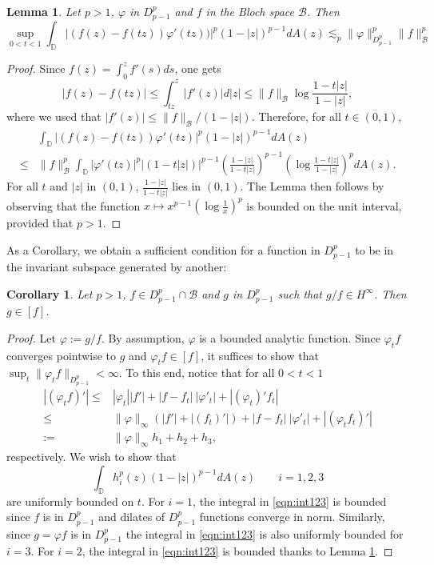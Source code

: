 \documentclass{birkjour}
\numberwithin{equation}{section}
\theoremstyle{plain}
\newtheorem{lemma}[theo]{Lemma}
\newtheorem{coro}[theo]{Corollary}
\theoremstyle{definition}
\newcommand{\D}{\mathbb{D}}
\newcommand{\1}{\mathds{1}}
\begin{document}
\begin{lemma}
    \label{lemma:int}
Let $p>1$, $\varphi$ in $D^p_{p-1}$ and $f$ in the Bloch space $\mathcal{B}$. Then 
\[
\sup_{0<t<1}\int_\D|(f(z)-f(tz))\varphi'(tz))|^p(1-|z|)^{p-1}dA(z)\lesssim_p\|\varphi\|_{D^p_{p-1}}^p\|f\|_{\mathcal{B}}^p
\]
\end{lemma}
\begin{proof}
Since $f(z)=\int_0^zf'(s)ds$, one gets
\[
|f(z)-f(tz)|\le\int_{tz}^z|f'(z)|d|z|\le\|f\|_\mathcal{B}\log\frac{1-t|z|}{1-|z|},
\]
where we used that $|f'(z)|\le\|f\|_\mathcal{B}/(1-|z|)$. Therefore, for all $t\in(0, 1)$,
\[
\begin{split}
&\int_\D|(f(z)-f(tz))\varphi'(tz)|^p(1-|z|)^{p-1}dA(z)\\
\le&\|f\|^p_\mathcal{B}\int_\D|\varphi'(tz)|^p|(1-t|z|)|^{p-1}\left(\frac{1-|z|}{1-t|z|}\right)^{p-1}\left(\log\frac{1-t|z|}{1-|z|}\right)^pdA(z).
\end{split}
\]
For all $t$ and $|z|$ in $(0, 1)$, $\frac{1-|z|}{1-t|z|}$ lies in $(0, 1)$. The Lemma then follows by observing that the function $x\mapsto x^{p-1}\left(\log\frac{1}{x}\right)^p$ is bounded on the unit interval, provided that $p>1$.
\end{proof}
As a Corollary, we obtain a sufficient condition for a function  in $D^p_{p-1}$ to be in the invariant subspace generated by another:
\begin{coro}
\label{coro:leq}
Let $p >1$, $f\in D^p_{p-1}\cap\mathcal{B}$ and $g$ in $D^p_{p-1}$ such that $g/f\in H^\infty$. Then $g\in [f]$.
\end{coro}
\begin{proof}
Let $\varphi:=g/f$. By assumption, $\varphi$ is a bounded analytic function. Since $\varphi_t f$ converges pointwise to $g$ and $\varphi_t f\in[f]$, it suffices to show that $\sup_t\|\varphi_tf\|_{D^p_{p-1}}<\infty$. To this end, notice that for all $0<t<1$
\[
\begin{split}
|(\varphi_tf)'|\le &|\varphi_t| |f'|+ |f-f_t|~|\varphi'_t|+|(\varphi_t)'f_t|\\
\le &\|\varphi\|_\infty (|f'|+|(f_t)'|)+ |f-f_t|~|\varphi'_t|+|(\varphi_tf_t)'|\\
:=& \|\varphi\|_\infty h_1+h_2+h_3,
\end{split}
\]
respectively. We wish to show that 
\begin{equation}
\label{eqn:int123}
\int_\D h_i^p(z)(1-|z|)^{p-1}dA(z)\qquad i=1, 2, 3
\end{equation}
are uniformly bounded on $t$. For $i=1$, the integral in \eqref{eqn:int123} is bounded since $f$ is in $D^p_{p-1}$ and dilates of $D^p_{p-1}$ functions converge in norm. Similarly, since $g=\varphi f$ is in $D^p_{p-1}$ the integral in \eqref{eqn:int123} is also uniformly bounded for $i=3$. For $i=2$, the integral in \eqref{eqn:int123} is bounded thanks to Lemma \ref{lemma:int}.
\end{proof} 
\end{document}

